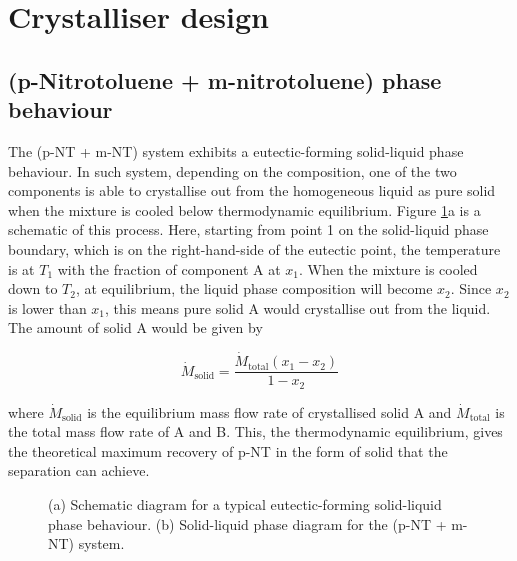 \section{Crystalliser design}

\subsection{(p-Nitrotoluene + m-nitrotoluene) phase behaviour}

The (p-NT + m-NT) system exhibits a eutectic-forming solid-liquid phase behaviour. In such system, depending on the composition, one of the two components is able to crystallise out from the homogeneous liquid as pure solid when the mixture is cooled below thermodynamic equilibrium. \cite{seader_separation_2011} Figure \ref{fig:eutectic schematic}a is a schematic of this process. Here, starting from point 1 on the solid-liquid phase boundary, which is on the right-hand-side of the eutectic point, the temperature is at $T_1$ with the fraction of component A at $x_1$. When the mixture is cooled down to $T_2$, at equilibrium, the liquid phase composition will become $x_2$. Since $x_2$ is lower than $x_1$, this means pure solid A would crystallise out from the liquid. The amount of solid A would be given by

\begin{equation}\label{eq:amount solid A equilibrium}
    \dot{M}_{\mathrm{solid}} = \frac{\dot{M}_{\mathrm{total}} (x_1 - x_2)}{1 - x_2}
\end{equation}

\noindent where $\dot{M}_{\mathrm{solid}}$ is the equilibrium mass flow rate of crystallised solid A and $\dot{M}_{\mathrm{total}}$ is the total mass flow rate of A and B. This, the thermodynamic equilibrium, gives the theoretical maximum recovery of p-NT in the form of solid that the separation can achieve.

\begin{figure}[h]
    \centering
    
    \caption{(a) Schematic diagram for a typical eutectic-forming solid-liquid phase behaviour. (b) Solid-liquid phase diagram for the (p-NT + m-NT) system.}
    \label{fig:eutectic schematic}
\end{figure}

